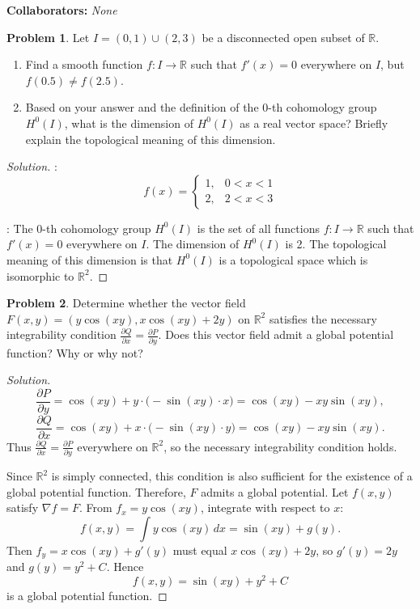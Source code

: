 \documentclass[12pt, a4paper]{article}
\theoremstyle{definition}
\newtheorem{problem}{Problem}
\newenvironment{solution}
  {\renewcommand\qedsymbol{$\blacksquare$}\begin{proof}[Solution]}
  {\end{proof}}
\begin{document}
\noindent \textbf{Collaborators:} \textit{None}
\vspace{0.8cm}


\begin{problem}
Let $I = (0, 1) \cup (2, 3)$ be a disconnected open subset of $\mathbb{R}$. 
\begin{enumerate}
    \item[(a)] Find a smooth function $f: I \to \mathbb{R}$ such that $f'(x) = 0$ everywhere on $I$, but $f(0.5) \neq f(2.5)$.
    \item[(b)] Based on your answer and the definition of the 0-th cohomology group $H^0(I)$, what is the dimension of $H^0(I)$ as a real vector space? Briefly explain the topological meaning of this dimension.
\end{enumerate}
\end{problem}

\begin{solution}
\item[(a)]: \[f(x) = 
\begin{cases}
1, & 0 < x < 1 \\
2, & 2 < x < 3 
\end{cases}
\] 
\item[(b)]: The 0-th cohomology group $H^0(I)$ is the set of all functions $f: I \to \mathbb{R}$ such that $f'(x) = 0$ everywhere on $I$. The dimension of $H^0(I)$ is 2. The topological meaning of this dimension is that $H^0(I)$ is a topological space which is isomorphic to $\mathbb{R}^2$.

\end{solution}

\vfill

\begin{problem}
Determine whether the vector field $F(x,y) = \left(y \cos(xy), x \cos(xy) + 2y\right)$ on $\mathbb{R}^2$ satisfies the necessary integrability condition $\frac{\partial Q}{\partial x} = \frac{\partial P}{\partial y}$. Does this vector field admit a global potential function? Why or why not?
\end{problem}

\begin{solution}
\[
\frac{\partial P}{\partial y} = \cos(xy) + y \cdot \bigl(-\sin(xy) \cdot x\bigr) = \cos(xy) - xy \sin(xy),
\]
\[
\frac{\partial Q}{\partial x} = \cos(xy) + x \cdot \bigl(-\sin(xy) \cdot y\bigr) = \cos(xy) - xy \sin(xy).
\]
Thus \(\displaystyle \frac{\partial Q}{\partial x} = \frac{\partial P}{\partial y}\) everywhere on \(\mathbb{R}^2\), so the necessary integrability condition holds.

Since \(\mathbb{R}^2\) is simply connected, this condition is also sufficient for the existence of a global potential function. Therefore, \(F\) admits a global potential.
Let \(f(x,y)\) satisfy \(\nabla f = F\). From \(f_x = y \cos(xy)\), integrate with respect to \(x\):
\[
f(x,y) = \int y \cos(xy)\, dx = \sin(xy) + g(y).
\]
Then \(f_y = x \cos(xy) + g'(y)\) must equal \(x \cos(xy) + 2y\), so \(g'(y) = 2y\) and \(g(y) = y^2 + C\). Hence
\[
f(x,y) = \sin(xy) + y^2 + C
\]
is a global potential function.
\end{solution}
\end{document}
